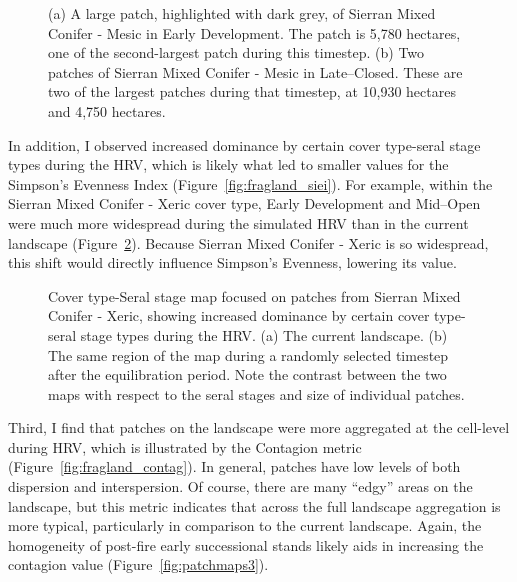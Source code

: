 \begin{figure}[!htbp]
  \centering
  \caption{(a) A large patch, highlighted with dark grey, of Sierran Mixed Conifer - Mesic in Early Development. The patch is 5,780 hectares, one of the second-largest patch during this timestep. (b) Two patches of Sierran Mixed Conifer - Mesic in Late--Closed. These are two of the largest patches during that timestep, at 10,930 hectares and 4,750 hectares.} 
  \label{fig:patchmaps1}
\end{figure}



In addition, I observed increased dominance by certain cover type-seral stage types during the HRV, which is likely what led to smaller values for the Simpson's Evenness Index (Figure~\ref{fig:fragland_siei}). For example, within the Sierran Mixed Conifer - Xeric cover type, Early Development and Mid--Open were much more widespread during the simulated HRV than in the current landscape (Figure~\ref{fig:patchmaps2}). Because Sierran Mixed Conifer - Xeric is so widespread, this shift would directly influence Simpson's Evenness, lowering its value.

\begin{figure}[!htbp]
  \centering
  \caption{Cover type-Seral stage map focused on patches from Sierran Mixed Conifer - Xeric, showing increased dominance by certain cover type-seral stage types during the HRV. (a) The current landscape. (b) The same region of the map during a randomly selected timestep after the equilibration period. Note the contrast between the two maps with respect to the seral stages and size of individual patches.} 
  \label{fig:patchmaps2}
\end{figure}


Third, I find that patches on the landscape were more aggregated at the cell-level during HRV, which is illustrated by the Contagion metric (Figure~\ref{fig:fragland_contag}). In general, patches have low levels of both dispersion and interspersion. Of course, there are many ``edgy'' areas on the landscape, but this metric indicates that across the full landscape aggregation is more typical, particularly in comparison to the current landscape. Again, the homogeneity of post-fire early successional stands likely aids in increasing the contagion value (Figure~\ref{fig:patchmaps3}). 

